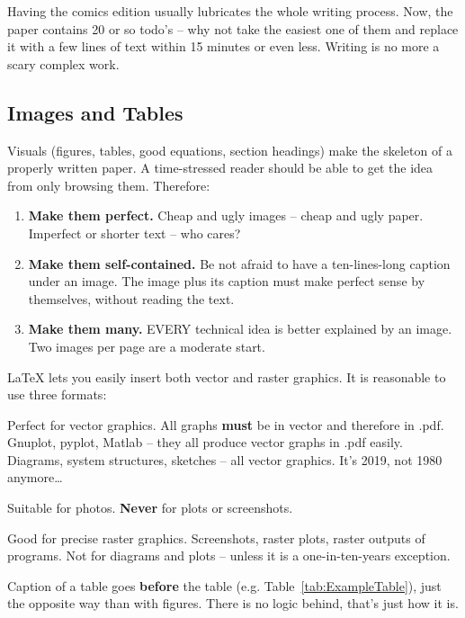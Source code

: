 \documentclass{ExcelAtFIT}
\begin{document}
Having the comics edition usually lubricates the whole writing process.  Now, the paper contains 20 or so todo's -- why not take the easiest one of them and replace it with a few lines of text within 15 minutes or even less.  Writing is no more a scary complex work.

\subsection{Images and Tables}
\label{sec:Images}

Visuals (figures, tables, good equations, section headings) make the skeleton of a properly written paper.  A time-stressed reader should be able to get the idea from only browsing them.  
Therefore:
\begin{enumerate}[noitemsep]
\item \textbf{Make them perfect.}  Cheap and ugly images -- cheap and ugly paper.  Imperfect or shorter text -- who cares?
\item \textbf{Make them self-contained.}  Be not afraid to have a ten-lines-long caption under an image.  The image plus its caption must make perfect sense by themselves, without reading the text.
\item \textbf{Make them many.}  EVERY technical idea is better explained by an image.  Two images per page are a moderate start.
\end{enumerate}
\LaTeX{} lets you easily insert both vector and raster graphics. It is reasonable to use three formats:
\begin{description}[noitemsep]
\item[.pdf] Perfect for vector graphics.  All graphs \textbf{must} be in vector and therefore in .pdf.  Gnuplot, pyplot, Matlab -- they all produce vector graphs in .pdf easily.  Diagrams, system structures, sketches -- all vector graphics.  It's 2019, not 1980 anymore\ldots
\item[.jpg] Suitable for photos.  \textbf{Never} for plots or screenshots.
\item[.png] Good for precise raster graphics.  Screenshots, raster plots, raster outputs of programs.  Not for diagrams and plots -- unless it is a one-in-ten-years exception.
\end{description}
Caption of a table goes \textbf{before} the table (e.g. Table~\ref{tab:ExampleTable}), just the opposite way than with figures.  There is no logic behind, that's just how it is.
\end{document}
